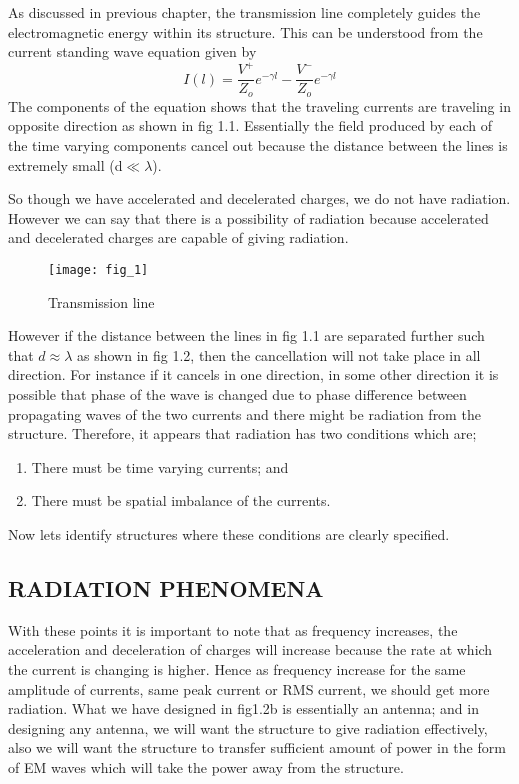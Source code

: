 As discussed in previous chapter, the transmission line completely guides the electromagnetic energy within its structure. This can be understood from the current standing wave equation given by
$$I(l)=\dfrac{V^+}{Z_o}e^{-\gamma l} - \dfrac{V^-}{Z_o}e^{-\gamma l}$$
The components of the equation shows that the traveling currents are traveling in opposite direction as shown in fig 1.1. Essentially the field produced by each of the time varying components cancel out because the distance between the lines is extremely small (d$\ll\lambda$). 

So though we have accelerated and decelerated charges, we do not have radiation. However we can say that there is a possibility of radiation because accelerated and decelerated charges are capable of giving radiation.
\begin{figure}
	\centering
	\texttt{[image: fig\_1]}
	\caption{Transmission line}
\end{figure}
However if the distance between the lines in fig 1.1 are separated further such that $d\approx\lambda$ as shown in fig 1.2, then the cancellation will not take place in all direction. For instance if it cancels in one direction, in some other direction it is possible that phase of the wave is changed due to phase difference between propagating waves of the two currents and there might be radiation from the structure.
Therefore, it appears that radiation has two conditions which are; 
\begin{enumerate}
	\item There must be time varying currents; and
	\item There must be spatial imbalance of the currents.
\end{enumerate}

Now lets identify structures where these conditions are clearly specified.

\subsection*{RADIATION PHENOMENA}
With these points it is important to note that as frequency increases, the acceleration and deceleration of charges will increase because the rate at which the current is changing is higher. Hence as frequency increase for the same amplitude of currents, same peak current or RMS current, we should get more radiation. What we have designed in fig1.2b is essentially an antenna; and in designing any antenna, we will want the structure to give radiation effectively, also we will want the structure to transfer sufficient amount of power in the form of EM waves which will take the power away from the structure.

